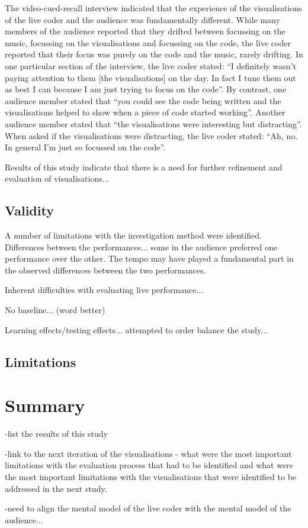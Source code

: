 The video-cued-recall interview indicated that the experience of the visualisations of the live coder and the audience was fundamentally different. While many members of the audience reported that they drifted between focussing on the music, focussing on the visualisations and focussing on the code, the live coder reported that their focus was purely on the code and the music, rarely drifting. In one particular section of the interview, the live coder stated: ``I definitely wasn't paying attention to them [the visualisations] on the day. In fact I tune them out as best I can because I am just trying to focus on the code''. By contrast, one audience member stated that ``you could see the code being written and the visualisations helped to show when a piece of code started working''. Another audience member stated that ``the visualisations were interesting but distracting''. When asked if the visualisations were distracting, the live coder stated: ``Ah, no. In general I'm just so focussed on the code''.

Results of this study indicate that there is a need for further refinement and evaluation of visualisations... 

\subsection{Validity}

A number of limitations with the investigation method were identified. 
Differences between the performances... some in the audience preferred one performance over the other. The tempo may have played a fundamental part in the observed differences between the two performances.

Inherent difficulties with evaluating live performance...

No baseline... (word better)

Learning effects/testing effects... attempted to order balance the study...

\more

\subsection{Limitations}

\more

\section{Summary}

-list the results of this study

-link to the next iteration of the visualisations - what were the most important limitations with the evaluation process that had to be identified and what were the most important limitations with the visualisations that were identified to be addressed in the next study.

-need to align the mental model of the live coder with the mental model of the audience...

\more




